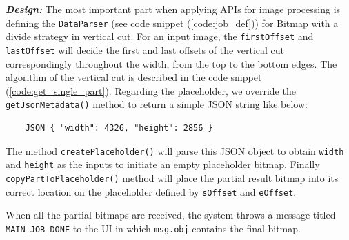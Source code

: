 \documentclass{sig-alternate}[10pt]
\begin{document}
\textbf{\emph{Design:}}
The most important part when applying APIs for image processing is defining the \texttt{DataParser} (see code snippet (\ref{code:job_def})) for Bitmap with a divide strategy in vertical cut. For an input image, the \texttt{firstOffset} and \texttt{lastOffset} will decide the first and last offsets of the vertical cut correspondingly throughout the width, from the top to the bottom edges. The algorithm of the vertical cut is described in the code snippet (\ref{code:get_single_part}). Regarding the placeholder, we override the \texttt{getJsonMetadata()} method to return a simple JSON string like below:

	\begin{lstlisting} 
	JSON { "width": 4326, "height": 2856 } 
	\end{lstlisting}

The method \texttt{createPlaceholder()} will parse this JSON object to obtain \texttt{width} and \texttt{height} as the inputs to initiate an empty placeholder bitmap. Finally \texttt{copyPartToPlaceholder()} method will place the partial result bitmap into its correct location on the placeholder defined by \texttt{sOffset} and \texttt{eOffset}.\\

\begin{figure}
\noindent {}
\end{figure}

When all the partial bitmaps are received, the system throws a message titled \texttt{MAIN\_JOB\_DONE} to the UI in which \texttt{msg.obj} contains the final bitmap.
\end{document}
